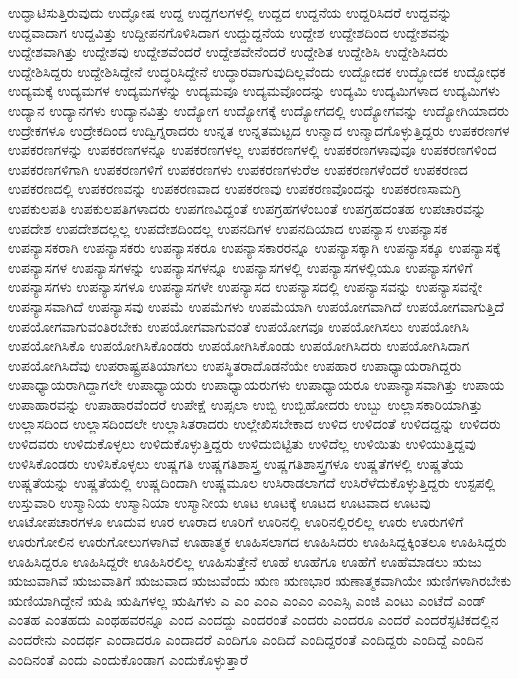 {ಉದ್ಘಾಟಿಸುತ್ತಿರುವುದು
ಉದ್ಘೋಷ
ಉದ್ದ
ಉದ್ದಗಲಗಳಲ್ಲಿ
ಉದ್ದದ
ಉದ್ದನೆಯ
ಉದ್ದರಿಸಿದರೆ
ಉದ್ದವನ್ನು
ಉದ್ದವಾದಾಗ
ಉದ್ದವಿತ್ತು
ಉದ್ದೀಪನಗೊಳಿಸಿದಾಗ
ಉದ್ದುದ್ದನೆಯ
ಉದ್ದೇಶ
ಉದ್ದೇಶದಿಂದ
ಉದ್ದೇಶವನ್ನು
ಉದ್ದೇಶವಾಗಿತ್ತು
ಉದ್ದೇಶವು
ಉದ್ದೇಶವೆಂದರೆ
ಉದ್ದೇಶವೇನೆಂದರೆ
ಉದ್ದೇಶಿತ
ಉದ್ದೇಶಿಸಿ
ಉದ್ದೇಶಿಸಿದರು
ಉದ್ದೇಶಿಸಿದ್ದರು
ಉದ್ದೇಶಿಸಿದ್ದೇನೆ
ಉದ್ಧರಿಸಿದ್ದೇನೆ
ಉದ್ಧಾರವಾಗುವುದಿಲ್ಲವೆಂದು
ಉದ್ಬೋದಕ
ಉದ್ಭೋದಕ
ಉದ್ಭೋಧಕ
ಉದ್ಯಮಕ್ಕೆ
ಉದ್ಯಮಗಳ
ಉದ್ಯಮಗಳನ್ನು
ಉದ್ಯಮವೂ
ಉದ್ಯಮವೊಂದನ್ನು
ಉದ್ಯಮಿ
ಉದ್ಯಮಿಗಳಾದ
ಉದ್ಯಮಿಗಳು
ಉದ್ಯಾನ
ಉದ್ಯಾನಗಳು
ಉದ್ಯಾನವಿತ್ತು
ಉದ್ಯೋಗ
ಉದ್ಯೋಗಕ್ಕೆ
ಉದ್ಯೋಗದಲ್ಲಿ
ಉದ್ಯೋಗವನ್ನು
ಉದ್ಯೋಗಿಯಾದರು
ಉದ್ರೇಕಗಳೂ
ಉದ್ರೇಕದಿಂದ
ಉದ್ವಿಗ್ನರಾದರು
ಉನ್ನತ
ಉನ್ನತಮಟ್ಟದ
ಉನ್ಮಾದ
ಉನ್ಮಾದಗೊಳ್ಳುತ್ತಿದ್ದರು
ಉಪಕರಣಗಳ
ಉಪಕರಣಗಳನ್ನು
ಉಪಕರಣಗಳನ್ನೂ
ಉಪಕರಣಗಳಲ್ಲ
ಉಪಕರಣಗಳಲ್ಲಿ
ಉಪಕರಣಗಳಾವುವೂ
ಉಪಕರಣಗಳಿಂದ
ಉಪಕರಣಗಳಿಗಾಗಿ
ಉಪಕರಣಗಳಿಗೆ
ಉಪಕರಣಗಳು
ಉಪಕರಣಗಳುರೆಅ
ಉಪಕರಣಗಳೆಂದರೆ
ಉಪಕರಣದ
ಉಪಕರಣದಲ್ಲಿ
ಉಪಕರಣವನ್ನು
ಉಪಕರಣವಾದ
ಉಪಕರಣವು
ಉಪಕರಣವೊಂದನ್ನು
ಉಪಕರಣಸಾಮಗ್ರಿ
ಉಪಕುಲಪತಿ
ಉಪಕುಲಪತಿಗಳಾದರು
ಉಪಗಣವಿದ್ದಂತೆ
ಉಪಗ್ರಹಗಳೆಂಬಂತೆ
ಉಪಗ್ರಹದಂತಹ
ಉಪಚಾರವನ್ನು
ಉಪದೇಶ
ಉಪದೇಶದಲ್ಲಲ್ಲ
ಉಪದೇಶದಿಂದಲ್ಲ
ಉಪನದಿಗಳ
ಉಪನದಿಯಾದ
ಉಪನ್ಯಾಸ
ಉಪನ್ಯಾಸಕ
ಉಪನ್ಯಾಸಕರಾಗಿ
ಉಪನ್ಯಾಸಕರು
ಉಪನ್ಯಾಸಕರೂ
ಉಪನ್ಯಾಸಕಾರರನ್ನೂ
ಉಪನ್ಯಾಸಕ್ಕಾಗಿ
ಉಪನ್ಯಾಸಕ್ಕೂ
ಉಪನ್ಯಾಸಕ್ಕೆ
ಉಪನ್ಯಾಸಗಳ
ಉಪನ್ಯಾಸಗಳನ್ನು
ಉಪನ್ಯಾಸಗಳನ್ನೂ
ಉಪನ್ಯಾಸಗಳಲ್ಲಿ
ಉಪನ್ಯಾಸಗಳಲ್ಲಿಯೂ
ಉಪನ್ಯಾಸಗಳಿಗೆ
ಉಪನ್ಯಾಸಗಳು
ಉಪನ್ಯಾಸಗಳೂ
ಉಪನ್ಯಾಸಗಳೇ
ಉಪನ್ಯಾಸದ
ಉಪನ್ಯಾಸದಲ್ಲಿ
ಉಪನ್ಯಾಸವನ್ನು
ಉಪನ್ಯಾಸವನ್ನೇ
ಉಪನ್ಯಾಸವಾಗಿದೆ
ಉಪನ್ಯಾಸವು
ಉಪಮೆ
ಉಪಮೆಗಳು
ಉಪಮೆಯಾಗಿ
ಉಪಯೋಗವಾಗಿದೆ
ಉಪಯೋಗವಾಗುತ್ತಿದೆ
ಉಪಯೋಗವಾಗುವಂತಿರಬೇಕು
ಉಪಯೋಗವಾಗುವಂತೆ
ಉಪಯೋಗವೂ
ಉಪಯೋಗಿಸಲು
ಉಪಯೋಗಿಸಿ
ಉಪಯೋಗಿಸಿಕೊ
ಉಪಯೋಗಿಸಿಕೊಂಡರು
ಉಪಯೋಗಿಸಿಕೊಂಡು
ಉಪಯೋಗಿಸಿದರು
ಉಪಯೋಗಿಸಿದಾಗ
ಉಪಯೋಗಿಸಿದೆವು
ಉಪರಾಷ್ಟ್ರಪತಿಯಾಗಲು
ಉಪಸ್ಥಿತರಾದೊಡನೆಯೇ
ಉಪಹಾರ
ಉಪಾಧ್ಯಾಯರಾಗಿದ್ದರು
ಉಪಾಧ್ಯಾಯರಾಗಿದ್ದಾಗಲೇ
ಉಪಾಧ್ಯಾಯರು
ಉಪಾಧ್ಯಾಯರುಗಳು
ಉಪಾಧ್ಯಾಯರೂ
ಉಪಾನ್ಯಾಸವಾಗಿತ್ತು
ಉಪಾಯ
ಉಪಾಹಾರವನ್ನು
ಉಪಾಹಾರವೆಂದರೆ
ಉಪೇಕ್ಷೆ
ಉಪ್ಸಲಾ
ಉಬ್ಬಿ
ಉಬ್ಬಿಹೋದರು
ಉಬ್ಬು
ಉಲ್ಲಾಸಕಾರಿಯಾಗಿತ್ತು
ಉಲ್ಲಾಸದಿಂದ
ಉಲ್ಲಾಸದಿಂದಲೇ
ಉಲ್ಲಾಸಿತರಾದರು
ಉಲ್ಲೇಖಿಸಬೇಕಾದ
ಉಳಿದ
ಉಳಿದಂತೆ
ಉಳಿದದ್ದನ್ನು
ಉಳಿದರು
ಉಳಿದವರು
ಉಳಿದುಕೊಳ್ಳಲು
ಉಳಿದುಕೊಳ್ಳುತ್ತಿದ್ದರು
ಉಳಿದುಬಿಟ್ಟಿತು
ಉಳಿದೆಲ್ಲ
ಉಳಿಯಿತು
ಉಳಿಯುತ್ತಿದ್ದವು
ಉಳಿಸಿಕೊಂಡರು
ಉಳಿಸಿಕೊಳ್ಳಲು
ಉಷ್ಣಗತಿ
ಉಷ್ಣಗತಿಶಾಸ್ತ್ರ
ಉಷ್ಣಗತಿಶಾಸ್ತ್ರಗಳೂ
ಉಷ್ಣತೆಗಳಲ್ಲಿ
ಉಷ್ಣತೆಯ
ಉಷ್ಣತೆಯನ್ನು
ಉಷ್ಣತೆಯಲ್ಲಿ
ಉಷ್ಣದಿಂದಾಗಿ
ಉಷ್ಣಮೂಲ
ಉಸಿರಾಡಲಾಗದೆ
ಉಸಿರೆಳೆದುಕೊಳ್ಳುತ್ತಿದ್ದರು
ಉಸ್ಟಪಲ್ಲಿ
ಉಸ್ತುವಾರಿ
ಉಸ್ಮಾನಿಯ
ಉಸ್ಮಾನಿಯಾ
ಉಸ್ಮಾನೀಯ
ಊಟ
ಊಟಕ್ಕೆ
ಊಟದ
ಊಟವಾದ
ಊಟವು
ಊಟೋಪಚಾರಗಳೂ
ಊದುವ
ಊರ
ಊರಾದ
ಊರಿಗೆ
ಊರಿನಲ್ಲಿ
ಊರಿನಲ್ಲಿರಲಿಲ್ಲ
ಊರು
ಊರುಗಳಿಗೆ
ಊರುಗೋಲಿನ
ಊರುಗೋಲುಗಳಾಗಿವೆ
ಊಹಾತ್ಮಕ
ಊಹಿಸಲಾಗದ
ಊಹಿಸಿದರು
ಊಹಿಸಿದ್ದಕ್ಕಿಂತಲೂ
ಊಹಿಸಿದ್ದರು
ಊಹಿಸಿದ್ದರೂ
ಊಹಿಸಿದ್ದರೇ
ಊಹಿಸಿರಲಿಲ್ಲ
ಊಹಿಸುತ್ತೇನೆ
ಊಹೆ
ಊಹೆಗೂ
ಊಹೆಗೆ
ಊಹೆಮಾಡಲು
ಋಜು
ಋಜುವಾಗಿವೆ
ಋಜುವಾತಿಗೆ
ಋಜುವಾದ
ಋಜುವೆಂದು
ಋಣ
ಋಣಭಾರ
ಋಣಾತ್ಮಕವಾಗಿಯೇ
ಋಣಿಗಳಾಗಿರಬೇಕು
ಋಣಿಯಾಗಿದ್ದೇನೆ
ಋಷಿ
ಋಷಿಗಳಲ್ಲ
ಋಷಿಗಳು
ಎ
ಎಂ
ಎಂಎ
ಎಂಎಂ
ಎಂಎಸ್ಸಿ
ಎಂಜಿ
ಎಂಟು
ಎಂಟೆದೆ
ಎಂಡ್
ಎಂತಹ
ಎಂತಹದು
ಎಂಥಹವರನ್ನೂ
ಎಂದ
ಎಂದದ್ದು
ಎಂದರಂತೆ
ಎಂದರು
ಎಂದರೂ
ಎಂದರೆ
ಎಂದರೆಸ್ಫಟಿಕದಲ್ಲಿನ
ಎಂದರೇನು
ಎಂದರ್ಥ
ಎಂದಾದರೂ
ಎಂದಾದರೆ
ಎಂದಿಗೂ
ಎಂದಿದೆ
ಎಂದಿದ್ದರಂತೆ
ಎಂದಿದ್ದರು
ಎಂದಿದ್ದೆ
ಎಂದಿನ
ಎಂದಿನಂತೆ
ಎಂದು
ಎಂದುಕೊಂಡಾಗ
ಎಂದುಕೊಳ್ಳುತ್ತಾರೆ
}
